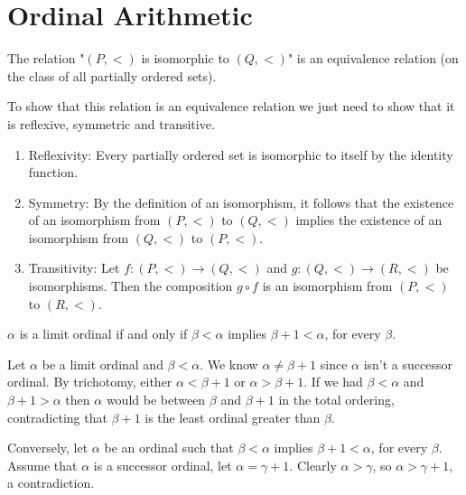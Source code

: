 \section{Ordinal Arithmetic}

\begin{problem}
  The relation "$(P, <)$ is isomorphic to $(Q, <)$" is an equivalence relation (on the class of all partially ordered sets).
\end{problem}

\begin{solution}
  To show that this relation is an equivalence relation we just need to show that it is reflexive, symmetric and transitive.
  \begin{enumerate}
    \item Reflexivity: Every partially ordered set is isomorphic to itself by the identity function.
    \item Symmetry: By the definition of an isomorphism, it follows that the existence of an isomorphism from $(P, <)$ to $(Q, <)$ implies the existence of an isomorphism from $(Q, <)$ to $(P, <)$.
    \item Transitivity: Let $f : (P, <) \rightarrow (Q, <)$ and $g : (Q, <) \rightarrow (R, <)$ be isomorphisms.
      Then the composition $g \circ f$ is an isomorphism from $(P, <)$ to $(R, <)$.
  \end{enumerate}
\end{solution}

\begin{problem}
  $\alpha$ is a limit ordinal if and only if $\beta < \alpha$ implies $\beta + 1 < \alpha$, for every $\beta$.
\end{problem}

\begin{solution}
  Let $\alpha$ be a limit ordinal and $\beta < \alpha$.
  We know $\alpha \neq \beta + 1$ since $\alpha$ isn't a successor ordinal.
  By trichotomy, either $\alpha < \beta + 1$ or $\alpha > \beta + 1$.
  If we had $\beta < \alpha$ and $\beta + 1 > \alpha$ then $\alpha$ would be between $\beta$ and $\beta + 1$ in the total ordering, contradicting that $\beta + 1$ is the least ordinal greater than $\beta$.

  Conversely, let $\alpha$ be an ordinal such that $\beta < \alpha$ implies $\beta + 1 < \alpha$, for every $\beta$.
  Assume that $\alpha$ is a successor ordinal, let $\alpha = \gamma + 1$.
  Clearly $\alpha > \gamma$, so $\alpha > \gamma + 1$, a contradiction.
\end{solution}

